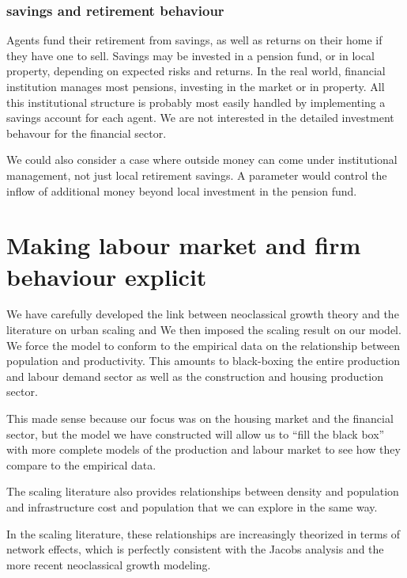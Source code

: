 \subsubsection{savings and retirement behaviour}
Agents fund their retirement from savings, as well as returns on their home if they have one to sell. Savings may be invested in a pension fund, or in local property,  depending on expected risks and returns. In the real world, financial institution manages most pensions, investing in the market or in property.  All this institutional structure is probably most easily handled by implementing a savings account for each agent. We are not interested in the detailed investment behavour for the financial sector.%


We could also consider a case where outside money can come under institutional management, not just local retirement savings. A parameter would control the inflow of additional money beyond local investment in the pension fund. 



\section{Making  labour market and firm behaviour explicit }
We have carefully developed the link between neoclassical growth theory and the literature on urban scaling \cite{bettencourtIntroductionUrbanScience2021} and  We then imposed the scaling result on our model.  We force the model to conform to the empirical data on the relationship between population and productivity. This amounts to black-boxing the entire production and labour demand sector as well as the construction and housing production sector. 

This made sense because our focus  was on the housing market and the financial sector, but the model we have constructed will allow us to ``fill the black box'' with more complete models of the production and labour market to see how they compare to the empirical data. 

The  scaling  literature also provides relationships between density and population and infrastructure cost and population that we can explore in the same way.

In the scaling literature, these relationships are increasingly theorized in terms of network effects, which is perfectly consistent with the Jacobs analysis and the more recent neoclassical growth modeling.


